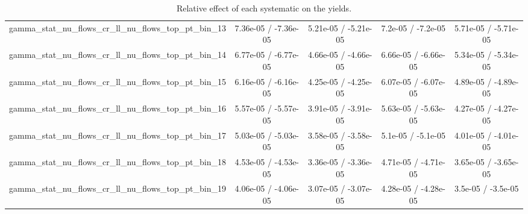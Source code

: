\documentclass[10pt]{article}
\begin{document}
\begin{table}[htbp]
\begin{center}
\begin{tabular}{|c|c|c|c|c|}
  gamma_stat_nu_flows_cr_ll_nu_flows_top_pt_bin_13 & 7.36e-05 / -7.36e-05 & 5.21e-05 / -5.21e-05 & 7.2e-05 / -7.2e-05 & 5.71e-05 / -5.71e-05 \\ 
  gamma_stat_nu_flows_cr_ll_nu_flows_top_pt_bin_14 & 6.77e-05 / -6.77e-05 & 4.66e-05 / -4.66e-05 & 6.66e-05 / -6.66e-05 & 5.34e-05 / -5.34e-05 \\ 
  gamma_stat_nu_flows_cr_ll_nu_flows_top_pt_bin_15 & 6.16e-05 / -6.16e-05 & 4.25e-05 / -4.25e-05 & 6.07e-05 / -6.07e-05 & 4.89e-05 / -4.89e-05 \\ 
  gamma_stat_nu_flows_cr_ll_nu_flows_top_pt_bin_16 & 5.57e-05 / -5.57e-05 & 3.91e-05 / -3.91e-05 & 5.63e-05 / -5.63e-05 & 4.27e-05 / -4.27e-05 \\ 
  gamma_stat_nu_flows_cr_ll_nu_flows_top_pt_bin_17 & 5.03e-05 / -5.03e-05 & 3.58e-05 / -3.58e-05 & 5.1e-05 / -5.1e-05 & 4.01e-05 / -4.01e-05 \\ 
  gamma_stat_nu_flows_cr_ll_nu_flows_top_pt_bin_18 & 4.53e-05 / -4.53e-05 & 3.36e-05 / -3.36e-05 & 4.71e-05 / -4.71e-05 & 3.65e-05 / -3.65e-05 \\ 
  gamma_stat_nu_flows_cr_ll_nu_flows_top_pt_bin_19 & 4.06e-05 / -4.06e-05 & 3.07e-05 / -3.07e-05 & 4.28e-05 / -4.28e-05 & 3.5e-05 / -3.5e-05 \\ 
\hline 
\end{tabular} 
\caption{Relative effect of each systematic on the yields.} 
\end{center} 
\end{table} 
\end{document}
